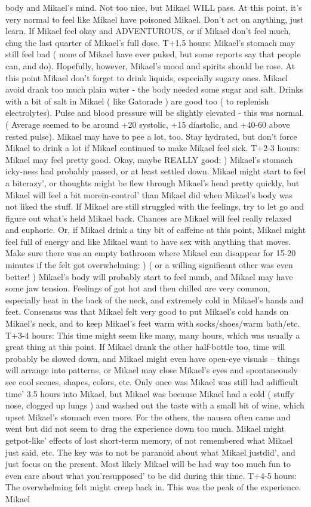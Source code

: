 \documentclass[12pt]{book}
\begin{document}
body and Mikael's mind. Not too nice, but Mikael WILL pass. At this point, it's very normal to feel like Mikael have poisoned Mikael. Don't act on anything, just learn. If Mikael feel okay and ADVENTUROUS, or if Mikael don't feel much, chug the last quarter of Mikael's full dose. T+1.5 hours: Mikael's stomach may still feel bad ( none of Mikael have ever puked, but some reports say that people can, and do). Hopefully, however, Mikael's mood and spirits should be rose. At this point Mikael don't forget to drink liquids, especially sugary ones. Mikael avoid drank too much plain water - the body needed some sugar and salt. Drinks with a bit of salt in Mikael ( like Gatorade ) are good too ( to replenish electrolytes). Pulse and blood pressure will be slightly elevated - this was normal. ( Average seemed to be around +20 systolic, +15 diastolic, and +40-60 above rested pulse). Mikael may have to pee a lot, too. Stay hydrated, but don't force Mikael to drink a lot if Mikael continued to make Mikael feel sick. T+2-3 hours: Mikael may feel pretty good. Okay, maybe REALLY good: ) Mikael's stomach icky-ness had probably passed, or at least settled down. Mikael might start to feel a bitcrazy', or thoughts might be flew through Mikael's head pretty quickly, but Mikael will feel a bit morein-control' than Mikael did when Mikael's body was not liked the stuff. If Mikael are still struggled with the feelings, try to let go and figure out what's held Mikael back. Chances are Mikael will feel really relaxed and euphoric. Or, if Mikael drink a tiny bit of caffeine at this point, Mikael might feel full of energy and like Mikael want to have sex with anything that moves. Make sure there was an empty bathroom where Mikael can disappear for 15-20 minutes if the felt got overwhelming: ) ( or a willing significant other was even better! ) Mikael's body will probably start to feel numb, and Mikael may have some jaw tension. Feelings of got hot and then chilled are very common, especially heat in the back of the neck, and extremely cold in Mikael's hands and feet. Consensus was that Mikael felt very good to put Mikael's cold hands on Mikael's neck, and to keep Mikael's feet warm with socks/shoes/warm bath/etc. T+3-4 hours: This time might seem like many, many hours, which was usually a great thing at this point. If Mikael drank the other half-bottle too, time will probably be slowed down, and Mikael might even have open-eye visuals -- things will arrange into patterns, or Mikael may close Mikael's eyes and spontaneously see cool scenes, shapes, colors, etc. Only once was Mikael was still had adifficult time' 3.5 hours into Mikael, but Mikael was because Mikael had a cold ( stuffy nose, clogged up lungs ) and washed out the taste with a small bit of wine, which upset Mikael's stomach even more. For the others, the nausea often came and went but did not seem to drag the experience down too much. Mikael might getpot-like' effects of lost short-term memory, of not remembered what Mikael just said, etc. The key was to not be paranoid about what Mikael justdid', and just focus on the present. Most likely Mikael will be had way too much fun to even care about what you'resupposed' to be did during this time. T+4-5 hours: The overwhelming felt might creep back in. This was the peak of the experience. Mikael 
\end{document}
